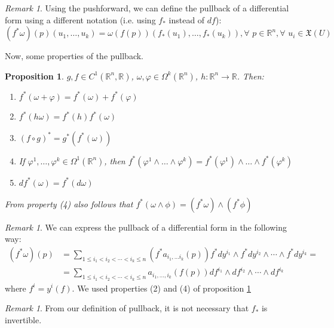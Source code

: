 \documentclass[a4paper,11pt,titlepage]{article}
\numberwithin{equation}{section}
\newtheorem{proposition}[theorem]{Proposition}
\theoremstyle{definition}
\theoremstyle{remark}
\newtheorem{remark}[theorem]{Remark}
\newcommand{\rfield}{\mathbb{R}}
\begin{document}
\begin{remark}
Using the pushforward, we can define the pullback of a differential form using a different notation (i.e. using $f_*$ instead of $df$):
  \begin{equation}
    (f^* \omega)(p) (u_1, \ldots, u_k) = \omega (f(p)) (f_*(u_1), \ldots, f_*(u_k)), \forall\, \, p \in \rfield^n, \forall \,\, u_i \in \mathfrak{X}(U)
  \end{equation}
\end{remark}

Now, some properties of the pullback.

\begin{proposition} \label{pullbackprop}
  $g, f \in C^1(\rfield^n, \rfield)$, $\omega, \varphi \in \Omega^k(\rfield^n)$, $h\colon \rfield^n \rightarrow \rfield$. Then:
  \begin{enumerate}
    \item $f^*(\omega + \varphi) = f^*(\omega) + f^*(\varphi)$
    \item $f^*(h \omega) = f^*(h)f^*(\omega)$
    \item $(f \circ g)^* = g^*(f^*(\omega))$
    \item If $\varphi^1, \ldots, \varphi^k \in \Omega^1(\rfield^n)$, then $f^*(\varphi^1 \wedge \ldots \wedge \varphi^k) = f^*(\varphi^1) \wedge \ldots \wedge f^*(\varphi^k)$
    \item $df^*(\omega) = f^*(d\omega)$
  \end{enumerate}
  From property (4) also follows that $f^*(\omega \wedge \phi) = (f^*\omega) \wedge (f^* \phi)$
\end{proposition}


\begin{remark}
We can express the pullback of a differential form in the following way:
\begin{align*}
(f^* \omega)(p) &= \sum\limits_{1 \le i_1 < i_2 < \cdots < i_k \le n} (f^*a_{i_1, \ldots i_k} (p)) f^*dy^{i_1} \wedge f^* dy^{i_2} \wedge \cdots \wedge f^* dy^{i_k} = \\
& = \sum\limits_{1 \le i_1 < i_2 < \cdots < i_k \le n} a_{i_1, \ldots, i_k} (f(p)) df^{i_1} \wedge df^{i_2} \wedge \cdots \wedge df^{i_k}
\end{align*}
where $f^i = y^i(f)$. We used properties (2) and (4) of proposition \ref{pullbackprop}
\end{remark}

\begin{remark}
  From our definition of pullback, it is not necessary that $f_*$ is invertible.
\end{remark}
\end{document}
